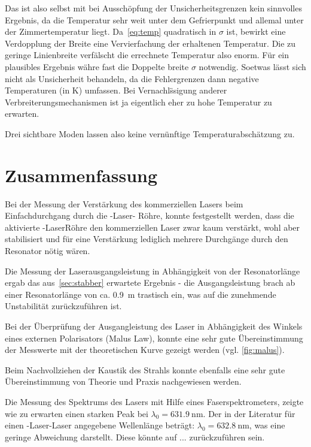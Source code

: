 \documentclass[slug=GL, room=HZDR\ Dresden/Rossendorf\,\ Geb.\ 620/123, supervisor=Tim\ Ziegler]{../../Lab_Report_LaTeX/lab_report}
\newcommand{\hne}{\ce{HeNe}-Laser}
\begin{document}
Das ist also selbst mit bei Aussch\"opfung der Unsicherheitsgrenzen kein
sinnvolles Ergebnis, da die Temperatur sehr weit unter dem
Gefrierpunkt und allemal unter der Zimmertemperatur
liegt. Da~\ref{eq:temp} quadratisch in \(\sigma\) ist, bewirkt eine
Verdopplung der Breite eine Vervierfachung der erhaltenen
Temperatur. Die zu geringe Linienbreite verf\"alscht die errechnete
Temperatur also enorm. F\"ur ein plausibles Ergebnis w\"ahre fast die
Doppelte breite \(\sigma\) notwendig. Soetwas l\"asst sich nicht als
Unsicherheit behandeln, da die Fehlergrenzen dann negative
Temperaturen (in \si{\kelvin}) umfassen. Bei Vernachl\"ssigung anderer
Verbreiterungsmechanismen ist ja eigentlich eher zu hohe Temperatur zu
erwarten.

Drei sichtbare Moden lassen also keine vern\"unftige
Temperaturabsch\"atzung zu.

\section {Zusammenfassung}
\label{sec:zusfass}
Bei der Messung der Verstärkung des kommerziellen Lasers beim
Einfachdurchgang durch die \hne - Röhre, konnte festgestellt werden,
dass die aktivierte \hne Röhre den kommerziellen Laser zwar kaum
verstärkt, wohl aber stabilisiert und für eine Verstärkung lediglich
mehrere Durchgänge durch den Resonator nötig wären.

Die Messung der Laserausgangsleistung in Abhängigkeit von der
Resonatorlänge ergab das aus~\ref{sec:stabber} erwartete Ergebnis -
die Ausgangsleistung brach ab einer Resonatorlänge von
ca. \SI{0,9}{\meter} trastisch ein, was auf die zunehmende
Unstabilität zurückzuführen ist.

Bei der Überprüfung der Ausgangleistung des Laser in Abhängigkeit des
Winkels eines externen Polarisators (Malus Law), konnte eine sehr gute
Übereinstimmung der Messwerte mit der theoretischen Kurve gezeigt
werden (vgl. \ref{fig:malus}).

Beim Nachvollziehen der Kaustik des Strahls konnte ebenfalls eine sehr
gute Übereinstimmung von Theorie und Praxis nachgewiesen werden.

Die Messung des Spektrums des Lasers mit Hilfe eines
Faserspektrometers, zeigte wie zu erwarten einen starken Peak bei
\(\lambda_0=\SI{631.9}{\nano\meter}\).  Der in der Literatur für einen
\hne-Laser angegebene Wellenlänge beträgt:
\(\lambda_0=\SI{632,8}{\nano\meter}\), was eine geringe Abweichung
darstellt.  Diese könnte auf ... zurückzuführen
sein. 
\end{document}
